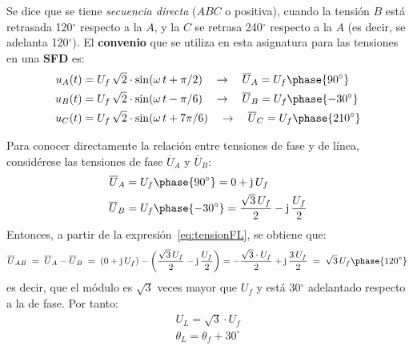 	Se dice que se tiene \textit{secuencia directa} ($ABC$ o positiva), cuando la tensión $B$ está retrasada 120$^\circ$ respecto a la $A$, y la $C$ se retrasa 240$^\circ$ respecto a la $A$ (es decir, se adelanta 120$^\circ$). El \textbf{convenio} que se utiliza en esta asignatura para las tensiones en una \textbf{SFD} es:
	\begin{align*}
		u_A(t)&=U_f\,\sqrt{2}\cdot \sin(\omega\, t +\pi/2) \quad\rightarrow\quad \overline{U}_A=U_f\phase {90^\circ}\\
		u_B(t)&=U_f\,\sqrt{2}\cdot \sin(\omega\, t -\pi/6) \quad\rightarrow\quad \overline{U}_B=U_f\phase {-30^\circ}\\
		u_C(t)&=U_f\,\sqrt{2}\cdot \sin(\omega\,t +7\pi/6) \quad\rightarrow\quad \overline{U}_C=U_f\phase {210^\circ}
	\end{align*}
	
	Para conocer directamente la relación entre tensiones de fase y de línea, considérese las tensiones de fase $\overline{U}_A$ y $\overline{U}_B$: 
	\begin{align*}
		\overline{U}_A &= U_f\phase{90^\circ}=0+\mathrm{j}\,U_f
		\\
		\overline{U}_B &= U_f\phase{-30^\circ}=\dfrac{\sqrt{3}\,U_f}{2}-\mathrm{j}\,\dfrac{U_f}{2}
	\end{align*}
	Entonces, a partir de la expresión~\eqref{eq:tensionFL}, se obtiene que:
	\begin{equation*}
		\overline{U}_{AB} \;=\; \overline{U}_{A}-\overline{U}_{B} \;=\; (0+\mathrm{j}\,U_f)-\left(\dfrac{\sqrt{3}\,U_f}{2}-\mathrm{j}\,\dfrac{U_f}{2}\right)=-\dfrac{\sqrt{3}\cdot U_f}{2}+\mathrm{j}\,\dfrac{3\,U_f}{2} \;=\; \sqrt{3}\,U_f \phase{ 120^\circ}\,
	\end{equation*}
	es decir, que el módulo es $\sqrt{3}$ veces mayor que $U_f$ y está 30$^\circ$ adelantado respecto a la de fase. Por tanto:  
	\begin{equation}\label{eq:sfd_fase-linea}
		\boxed{
			\begin{array}{l}
				U_L = \sqrt{3}\cdot U_f\\
				\theta_L = \theta_f + 30^\circ\\
			\end{array}
		} 
	\end{equation}
	
